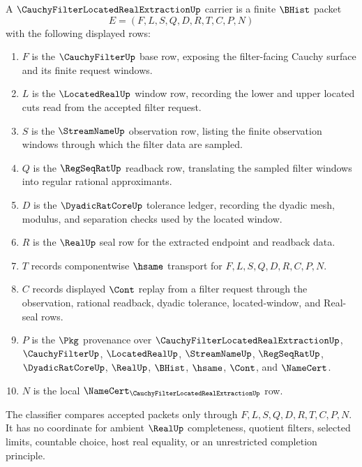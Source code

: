 \begin{definition}
\label{def:cauchy-filter-located-real-extraction-carrier}
A $\CauchyFilterLocatedRealExtractionUp$ carrier is a finite $\BHist$ packet
$$
E=(F,L,S,Q,D,R,T,C,P,N)
$$
with the following displayed rows:
\begin{enumerate}
\item $F$ is the $\CauchyFilterUp$ base row, exposing the filter-facing Cauchy surface and its finite request windows.
\item $L$ is the $\LocatedRealUp$ window row, recording the lower and upper located cuts read from the accepted filter request.
\item $S$ is the $\StreamNameUp$ observation row, listing the finite observation windows through which the filter data are sampled.
\item $Q$ is the $\RegSeqRatUp$ readback row, translating the sampled filter windows into regular rational approximants.
\item $D$ is the $\DyadicRatCoreUp$ tolerance ledger, recording the dyadic mesh, modulus, and separation checks used by the located window.
\item $R$ is the $\RealUp$ seal row for the extracted endpoint and readback data.
\item $T$ records componentwise $\hsame$ transport for $F,L,S,Q,D,R,C,P,N$.
\item $C$ records displayed $\Cont$ replay from a filter request through the observation, rational readback, dyadic tolerance, located-window, and Real-seal rows.
\item $P$ is the $\Pkg$ provenance over $\CauchyFilterLocatedRealExtractionUp$, $\CauchyFilterUp$, $\LocatedRealUp$, $\StreamNameUp$, $\RegSeqRatUp$, $\DyadicRatCoreUp$, $\RealUp$, $\BHist$, $\hsame$, $\Cont$, and $\NameCert$.
\item $N$ is the local $\NameCert_{\CauchyFilterLocatedRealExtractionUp}$ row.
\end{enumerate}
The classifier compares accepted packets only through $F,L,S,Q,D,R,T,C,P,N$. It has no coordinate for ambient $\RealUp$ completeness, quotient filters, selected limits, countable choice, host real equality, or an unrestricted completion principle.
\end{definition}

